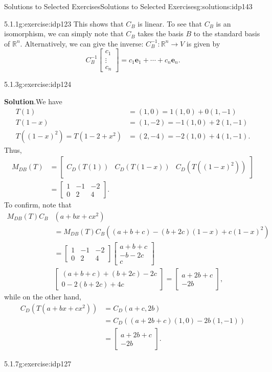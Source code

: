 \documentclass[oneside,10pt,]{book}
\newcommand{\blocktitlefont}{\relax}
\numberwithin{equation}{section}
\newcommand{\bbm}{\begin{bmatrix}}
\newcommand{\ebm}{\end{bmatrix}}
\newcommand{\R}{\mathbb{R}}
\newcommand{\amp}{&}
\begin{document}
\begin{solutions-chapter}{Solutions to Selected Exercises}{}{Solutions to Selected Exercises}{}{}{g:solutions:idp143}
\begin{inlinesolution}{5.1.1}{}{g:exercise:idp123}
This shows that \(C_B\) is linear. To see that \(C_B\) is an isomorphism, we can simply note that \(C_B\) takes the basis \(B\) to the standard basis of \(\R^n\). Alternatively, we can give the inverse: \(C_B^{-1}:\R^n\to V\) is given by%
\begin{equation*}
C_B^{-1}\bbm c_1\\\vdots \\c_n\ebm = c_1\mathbf{e}_1+\cdots +c_n\mathbf{e}_n\text{.}
\end{equation*}
%
\end{inlinesolution}%
\begin{inlinesolution}{5.1.3}{}{g:exercise:idp124}%
\par\smallskip%
\noindent\textbf{\blocktitlefont Solution}.\hypertarget{g:solution:idp176-back}{}\quad{}We have%
\begin{align*}
T(1) \amp = (1,0) = 1(1,0)+0(1,-1) \\
T(1-x) \amp= (1,-2) = -1(1,0)+2(1,-1) \\
T((1-x)^2) = T(1-2+x^2) \amp = (2, -4) = -2(1,0)+4(1,-1)\text{.}
\end{align*}
Thus,%
\begin{align*}
M_{DB}(T) \amp = \bbm C_D(T(1))\amp C_D(T(1-x)) \amp C_D(T((1-x)^2))\ebm\\
\amp = \bbm 1\amp -1\amp -2\\0\amp 2\amp 4\ebm\text{.}
\end{align*}
To confirm, note that%
\begin{align*}
M_{DB}(T)C_B\amp (a+bx+cx^2)\\
\amp = M_{DB}(T)C_B((a+b+c)-(b+2c)(1-x)+c(1-x)^2)\\
\amp = \bbm 1\amp -1\amp -2\\0\amp 2\amp 4\ebm\bbm a+b+c\\ -b-2c\\c\ebm\\
\amp \bbm (a+b+c)+(b+2c)-2c\\0-2(b+2c)+4c\ebm = \bbm a+2b+c\\-2b\ebm\text{,}
\end{align*}
while on the other hand,%
\begin{align*}
C_D(T(a+bx+cx^2)) \amp= C_D(a+c,2b)\\
\amp = C_D((a+2b+c)(1,0)-2b(1,-1))\\
\amp = \bbm a+2b+c\\-2b\ebm\text{.}
\end{align*}
%
\end{inlinesolution}%
\begin{inlinesolution}{5.1.7}{}{g:exercise:idp127}%

\end{inlinesolution}
\end{solutions-chapter}
\end{document}
